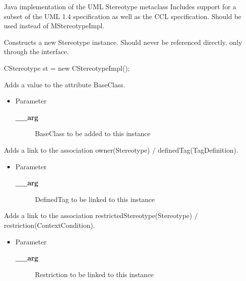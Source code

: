 {Java implementation of the UML Stereotype metaclass
 Includes support for a subset of the UML 1.4 specification as well as the
 CCL specification. Should be used instead of MStereotypeImpl.}
\constructors
{}
\begin{desc}Constructs a new Stereotype instance.
 Should never be referenced directly, only through the interface. \mbox{}\newline

 \mbox{}\newline

 CStereotype st = new CStereotypeImpl();
\end{desc}

\methods
{}
\begin{desc}Adds a value to the attribute BaseClass.
\begin{itemize}
\item{Parameter
  \begin{description}
   \item[{\bf \_\_arg}]{BaseClass to be added to this instance}
  \end{description}}
\end{itemize}
\end{desc}

\begin{desc}Adds a link to the association owner(Stereotype)
  $/$ definedTag(TagDefinition).
\begin{itemize}
\item{Parameter
  \begin{description}
   \item[{\bf \_\_arg}]{DefinedTag to be linked to this instance}
  \end{description}}
\end{itemize}
\end{desc}

\begin{desc}Adds a link to the association restrictedStereotype(Stereotype)
 $/$ restriction(ContextCondition).
\begin{itemize}
\item{Parameter
  \begin{description}
   \item[{\bf \_\_arg}]{Restriction to be linked to this instance}
  \end{description}}
\end{itemize}
\end{desc}


